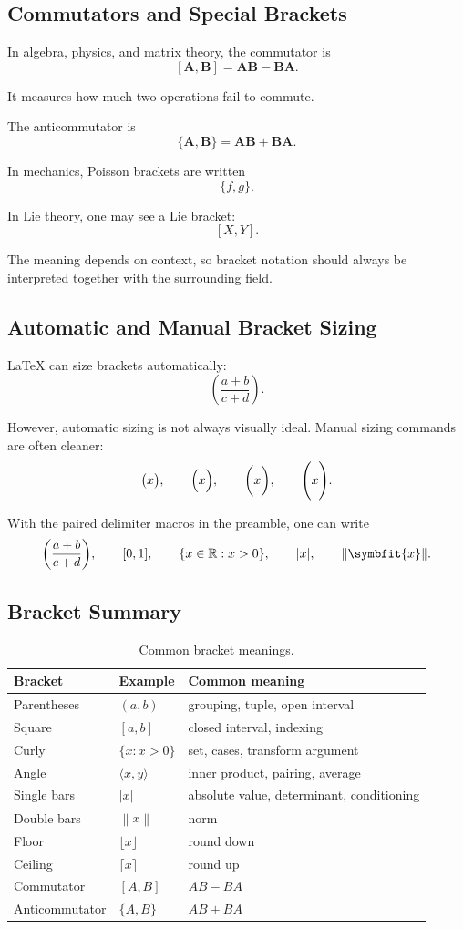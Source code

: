 \documentclass[11pt,twocolumn]{article}
\DeclarePairedDelimiter{\mparen}{\lparen}{\rparen}
\DeclarePairedDelimiter{\mbracks}{\lbrack}{\rbrack}
\DeclarePairedDelimiter{\mbraces}{\lbrace}{\rbrace}
\DeclarePairedDelimiter{\mabs}{\lvert}{\rvert}
\DeclarePairedDelimiter{\mnorm}{\lVert}{\rVert}
\newcommand{\R}{\mathbb{R}}
\newcommand{\vct}[1]{\symbfit{#1}}   %
\newcommand{\mat}[1]{\symbf{#1}}     %
\newcommand{\norm}[1]{\left\lVert #1 \right\rVert}
\newcommand{\abs}[1]{\left\lvert #1 \right\rvert}
\begin{document}
\subsection{Commutators and Special Brackets}

In algebra, physics, and matrix theory, the commutator is
\[
[\mat{A},\mat{B}]
=
\mat{A}\mat{B}
-
\mat{B}\mat{A}.
\]

It measures how much two operations fail to commute.

The anticommutator is
\[
\{\mat{A},\mat{B}\}
=
\mat{A}\mat{B}
+
\mat{B}\mat{A}.
\]

In mechanics, Poisson brackets are written
\[
\{f,g\}.
\]

In Lie theory, one may see a Lie bracket:
\[
[X,Y].
\]

The meaning depends on context, so bracket notation should always be interpreted
together with the surrounding field.

\subsection{Automatic and Manual Bracket Sizing}

LaTeX can size brackets automatically:
\[
\left(
\frac{a+b}{c+d}
\right).
\]

However, automatic sizing is not always visually ideal. Manual sizing commands
are often cleaner:
\[
\bigl( x \bigr),
\qquad
\Bigl( x \Bigr),
\qquad
\biggl( x \biggr),
\qquad
\Biggl( x \Biggr).
\]

With the paired delimiter macros in the preamble, one can write
\[
\mparen*{\frac{a+b}{c+d}},
\qquad
\mbracks*{0,1},
\qquad
\mbraces*{x\in\R : x>0},
\qquad
\mabs*{x},
\qquad
\mnorm*{\vct{x}}.
\]

\subsection{Bracket Summary}

\begin{table}[ht]
\centering
\caption{Common bracket meanings.}
\begin{tabular}{lll}
\toprule
Bracket & Example & Common meaning \\
\midrule
Parentheses & $(a,b)$ & grouping, tuple, open interval \\
Square & $[a,b]$ & closed interval, indexing \\
Curly & $\{x:x>0\}$ & set, cases, transform argument \\
Angle & $\langle x,y\rangle$ & inner product, pairing, average \\
Single bars & $\abs{x}$ & absolute value, determinant, conditioning \\
Double bars & $\norm{x}$ & norm \\
Floor & $\lfloor x\rfloor$ & round down \\
Ceiling & $\lceil x\rceil$ & round up \\
Commutator & $[A,B]$ & $AB-BA$ \\
Anticommutator & $\{A,B\}$ & $AB+BA$ \\
\bottomrule
\end{tabular}
\end{table}
\end{document}

